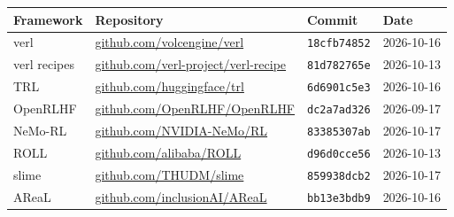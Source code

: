\begin{tabular}{llll}
\toprule
Framework & Repository & Commit & Date \\
\midrule
verl & \url{github.com/volcengine/verl} & \texttt{18cfb74852} & 2026-10-16 \\
verl recipes & \url{github.com/verl-project/verl-recipe} & \texttt{81d782765e} & 2026-10-13 \\
TRL & \url{github.com/huggingface/trl} & \texttt{6d6901c5e3} & 2026-10-16 \\
OpenRLHF & \url{github.com/OpenRLHF/OpenRLHF} & \texttt{dc2a7ad326} & 2026-09-17 \\
NeMo-RL & \url{github.com/NVIDIA-NeMo/RL} & \texttt{83385307ab} & 2026-10-17 \\
ROLL & \url{github.com/alibaba/ROLL} & \texttt{d96d0cce56} & 2026-10-13 \\
slime & \url{github.com/THUDM/slime} & \texttt{859938dcb2} & 2026-10-17 \\
AReaL & \url{github.com/inclusionAI/AReaL} & \texttt{bb13e3bdb9} & 2026-10-16 \\
\bottomrule
\end{tabular}

